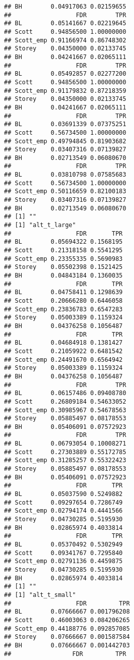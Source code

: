 \documentclass{article}\usepackage[]{graphicx}\usepackage[]{color}
\makeatletter
\newenvironment{kframe}{%
 \def\at@end@of@kframe{}%
 \ifinner\ifhmode%
  \def\at@end@of@kframe{\end{minipage}}%
  \begin{minipage}{\columnwidth}%
 \fi\fi%
 \def\FrameCommand##1{\hskip\@totalleftmargin \hskip-\fboxsep
 \colorbox{shadecolor}{##1}\hskip-\fboxsep
     \hskip-\linewidth \hskip-\@totalleftmargin \hskip\columnwidth}%
 \MakeFramed {\advance\hsize-\width
   \@totalleftmargin\z@ \linewidth\hsize
   \@setminipage}}%
 {\par\unskip\endMakeFramed%
 \at@end@of@kframe}
\newenvironment{knitrout}{}{} %
\makeatother
\begin{document}
\begin{knitrout}
\begin{kframe}
\begin{verbatim}
## BH        0.04917063 0.02159655
##                  FDR        TPR
## BL        0.05141667 0.02219645
## Scott     0.94856500 1.00000000
## Scott_emp 0.91166974 0.86748302
## Storey    0.04350000 0.02133745
## BH        0.04241667 0.02065111
##                  FDR        TPR
## BL        0.05492857 0.02277200
## Scott     0.94856500 1.00000000
## Scott_emp 0.91179832 0.87218359
## Storey    0.04350000 0.02133745
## BH        0.04241667 0.02065111
##                  FDR        TPR
## BL        0.03691339 0.07375251
## Scott     0.56734500 1.00000000
## Scott_emp 0.49794845 0.81903682
## Storey    0.03407316 0.07139827
## BH        0.02713549 0.06080670
##                  FDR        TPR
## BL        0.03810798 0.07585683
## Scott     0.56734500 1.00000000
## Scott_emp 0.50116659 0.82100183
## Storey    0.03407316 0.07139827
## BH        0.02713549 0.06080670
## [1] ""
## [1] "alt_t_large"
##                  FDR       TPR
## BL        0.05694322 0.1568195
## Scott     0.21318158 0.5541295
## Scott_emp 0.23355335 0.5690983
## Storey    0.05502398 0.1521425
## BH        0.04843184 0.1360035
##                  FDR       TPR
## BL        0.04758411 0.1298639
## Scott     0.20666280 0.6446058
## Scott_emp 0.23836783 0.6547283
## Storey    0.05003389 0.1159324
## BH        0.04376258 0.1056487
##                  FDR       TPR
## BL        0.04684918 0.1381427
## Scott     0.21059922 0.6481542
## Scott_emp 0.24491670 0.6564942
## Storey    0.05003389 0.1159324
## BH        0.04376258 0.1056487
##                  FDR        TPR
## BL        0.06157486 0.09408780
## Scott     0.26809184 0.54633052
## Scott_emp 0.30985967 0.54678563
## Storey    0.05885497 0.08178553
## BH        0.05406091 0.07572923
##                  FDR        TPR
## BL        0.06793054 0.10008271
## Scott     0.27303889 0.55172785
## Scott_emp 0.31285257 0.55322423
## Storey    0.05885497 0.08178553
## BH        0.05406091 0.07572923
##                  FDR       TPR
## BL        0.05037590 0.5249882
## Scott     0.09297654 0.7286749
## Scott_emp 0.02794174 0.4441566
## Storey    0.04730285 0.5195930
## BH        0.02865974 0.4033814
##                  FDR       TPR
## BL        0.05370492 0.5302949
## Scott     0.09341767 0.7295840
## Scott_emp 0.02791136 0.4459875
## Storey    0.04730285 0.5195930
## BH        0.02865974 0.4033814
## [1] ""
## [1] "alt_t_small"
##                  FDR         TPR
## BL        0.07666667 0.001796208
## Scott     0.46003063 0.084206265
## Scott_emp 0.44188776 0.092857085
## Storey    0.07666667 0.001587584
## BH        0.07666667 0.001442703
##                 FDR         TPR

\end{verbatim}
\end{kframe}
\end{knitrout}
\end{document}
